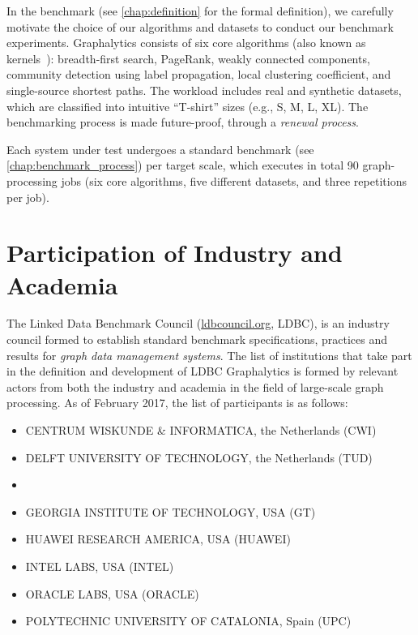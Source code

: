 In the benchmark (see \cref{chap:definition} for the formal definition), we carefully motivate the choice of our algorithms and datasets to conduct our benchmark experiments. Graphalytics consists of six core algorithms (also known as kernels~\cite{DBLP:conf/hipc/BaderM05}): breadth-first search, PageRank, weakly connected components, community detection using label propagation, local clustering coefficient, and single-source shortest paths. The workload includes real and synthetic datasets, which are classified into intuitive ``T-shirt'' sizes (e.g., S, M, L, XL). The benchmarking process is made future-proof, through a {\it renewal process}. 

Each system under test undergoes a standard benchmark (see \cref{chap:benchmark_process}) per target scale, which executes in total 90 graph-processing jobs (six core algorithms, five different datasets, and three repetitions per job).


\section{Participation of Industry and Academia}
The Linked Data Benchmark Council (\url{ldbcouncil.org}, LDBC), is an industry council formed to 
establish standard benchmark specifications, practices and results for {\em graph data management systems}. The list of institutions that take part in the definition and development of LDBC Graphalytics is formed by relevant actors from both the industry and academia in the field of large-scale graph processing. As of February 2017, the list of participants is as follows:

\begin{itemize}
	\item \MakeUppercase{Centrum Wiskunde \& Informatica}, the Netherlands (CWI)
	\item \MakeUppercase{Delft University of Technology}, the Netherlands (TUD)
	\item {}
	\item \MakeUppercase{Georgia Institute of Technology}, USA (GT)
	\item \MakeUppercase{Huawei Research America}, USA (HUAWEI)
	\item \MakeUppercase{Intel Labs}, USA (INTEL)
	\item \MakeUppercase{Oracle Labs}, USA (ORACLE)
	\item \MakeUppercase{Polytechnic University of Catalonia}, Spain (UPC)
\end{itemize}

